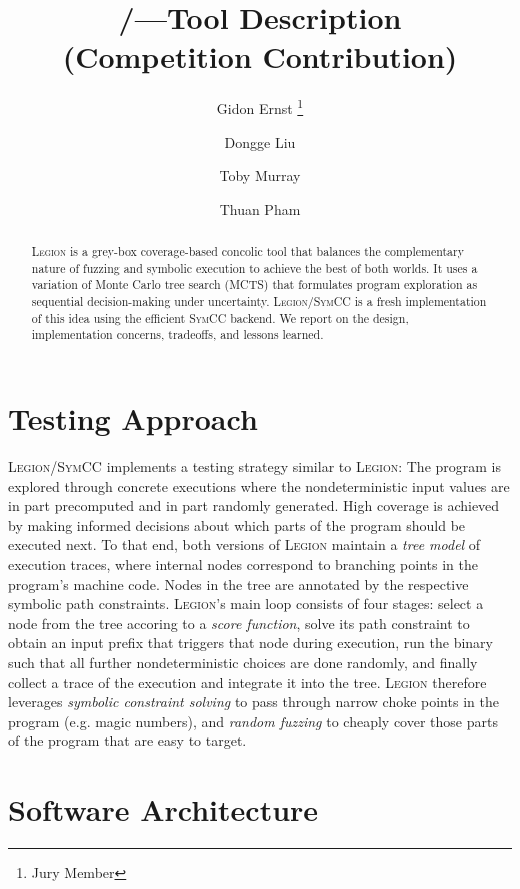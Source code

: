 \documentclass{llncs}
\author{
    Gidon Ernst
        \inst{1} \thanks{Jury Member}
\and
    Dongge Liu
        \inst{2}
\and
    Toby Murray
        \inst{2}
\and
    Thuan Pham
        \inst{2}
}
\title{\Legion/\SymCC---Tool Description \\ (Competition Contribution)}
\institute{
    LMU Munich, \mailto{gidon.ernst@lmu.de}
\and
    University of Melbourne,
    \mailto{donggel@student.unimelb.edu.au},
    \mailto{toby.murray@unimelb.edu.au},
    \mailto{thuan.pham@unimelb.edu.au}
}
\newcommand{\Legion}{\textsc{Legion}\xspace}
\newcommand{\SymCC}{\textsc{SymCC}\xspace}
\begin{document}
\maketitle

\begin{abstract}
\Legion is a grey-box coverage-based concolic tool that
balances the complementary nature of fuzzing and symbolic execution
to achieve the best of both worlds.
It uses a variation of Monte Carlo tree search (MCTS)
that formulates program exploration as sequential decision-making
under uncertainty.
\Legion/\SymCC is a fresh implementation of this idea using the
efficient \SymCC backend.
We report on the design, implementation concerns, tradeoffs, and lessons learned.


\end{abstract}

\section{Testing Approach}
\label{sec:approach}

\Legion/\SymCC implements a testing strategy similar to \Legion:
The program is explored through concrete executions where the nondeterministic input values are in part precomputed and in part randomly generated.
High coverage is achieved by making informed decisions about which parts of the program should be executed next.
To that end, both versions of \Legion maintain a \emph{tree model} of execution traces, where internal nodes correspond to branching points in the program's machine code.
Nodes in the tree are annotated by the respective symbolic path constraints.
\Legion's main loop consists of four stages:
select a node from the tree accoring to a \emph{score function},
solve its path constraint to obtain an input prefix that triggers that node during execution,
run the binary such that all further nondeterministic choices are done randomly,
and finally collect a trace of the execution and integrate it into the tree.
\Legion therefore leverages \emph{symbolic constraint solving} to pass through
narrow choke points in the program (e.g. magic numbers),
and \emph{random fuzzing} to cheaply cover those parts of the program that are easy to target.


\section{Software Architecture}
\label{sec:architecture}
\end{document}
